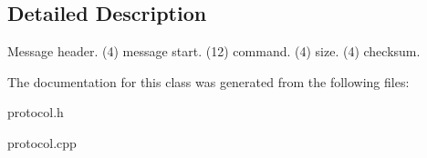 \subsection{Detailed Description}
Message header. (4) message start. (12) command. (4) size. (4) checksum. 

The documentation for this class was generated from the following files\+:\begin{DoxyCompactItemize}
\item 
protocol.\+h\item 
protocol.\+cpp\end{DoxyCompactItemize}
